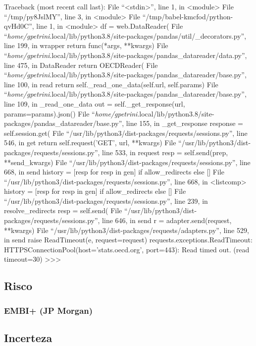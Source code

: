 \documentclass[11pt]{article}
\begin{document}
Traceback (most recent call last):
  File ``<stdin>'', line 1, in <module>
  File ``/tmp/py8JslMY'', line 3, in <module>
  File ``/tmp/babel-kmcfod/python-qvHd0C'', line 1, in <module>
    df = web.DataReader(
  File ``\emph{home/gpetrini}.local/lib/python3.8/site-packages/pandas/util/\_decorators.py'', line 199, in wrapper
    return func(*args, **kwargs)
  File ``\emph{home/gpetrini}.local/lib/python3.8/site-packages/pandas\_datareader/data.py'', line 475, in DataReader
    return OECDReader(
  File ``\emph{home/gpetrini}.local/lib/python3.8/site-packages/pandas\_datareader/base.py'', line 100, in read
    return self.\_read\_one\_data(self.url, self.params)
  File ``\emph{home/gpetrini}.local/lib/python3.8/site-packages/pandas\_datareader/base.py'', line 109, in \_read\_one\_data
    out = self.\_get\_response(url, params=params).json()
  File ``\emph{home/gpetrini}.local/lib/python3.8/site-packages/pandas\_datareader/base.py'', line 155, in \_get\_response
    response = self.session.get(
  File ``/usr/lib/python3/dist-packages/requests/sessions.py'', line 546, in get
    return self.request('GET', url, **kwargs)
  File ``/usr/lib/python3/dist-packages/requests/sessions.py'', line 533, in request
    resp = self.send(prep, **send\_kwargs)
  File ``/usr/lib/python3/dist-packages/requests/sessions.py'', line 668, in send
    history = [resp for resp in gen] if allow\_redirects else []
  File ``/usr/lib/python3/dist-packages/requests/sessions.py'', line 668, in <listcomp>
    history = [resp for resp in gen] if allow\_redirects else []
  File ``/usr/lib/python3/dist-packages/requests/sessions.py'', line 239, in resolve\_redirects
    resp = self.send(
  File ``/usr/lib/python3/dist-packages/requests/sessions.py'', line 646, in send
    r = adapter.send(request, **kwargs)
  File ``/usr/lib/python3/dist-packages/requests/adapters.py'', line 529, in send
    raise ReadTimeout(e, request=request)
requests.exceptions.ReadTimeout: HTTPSConnectionPool(host='stats.oecd.org', port=443): Read timed out. (read timeout=30)
>>>

\subsection{Risco}
\label{sec:org824ecf7}

\subsubsection{EMBI+ (JP Morgan)}
\label{sec:orgb920213}


\subsection{Incerteza}
\label{sec:org73fa42d}
\end{document}
